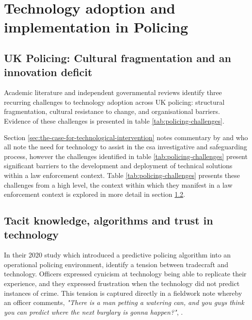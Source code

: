 \documentclass[12pt,a4paper,oneside]{report}
\begin{document}
\chapter{Technology adoption and implementation in Policing}  
\label{ch:technology-adoption-and-implementation-in-policing}

\section{UK Policing: Cultural fragmentation and an innovation deficit}
\label{sec:uk-policing-cultural-fragmentation-and-an-innovation-deficit}
Academic literature and independent governmental reviews identify three recurring challenges to technology adoption across UK policing: structural fragmentation, cultural resistance to change, and organisational barriers. Evidence of these challenges is presented in table \ref{tab:policing-challenges}.

Section \ref{sec:the-case-for-technological-intervention} notes commentary by \citet{winters2016knew,winters2017stages} and \citet{li2020identifying} who all note the need for technology to assist in the \gls{csa} investigative and safeguarding process, however the challenges identified in table \ref{tab:policing-challenges} present significant barriers to the development and deployment of technical solutions within a law enforcement context. Table \ref{tab:policing-challenges} presents these challenges from a high level, the context within which they manifest in a law enforcement context is explored in more detail in section \ref{sec:tacit-knowledge-algorithms-and-trust-in-technology}.

\section{Tacit knowledge, algorithms and trust in technology}
\label{sec:tacit-knowledge-algorithms-and-trust-in-technology}
In their 2020 study which introduced a predictive policing algorithm into an operational policing environment, \citet{ratcliffe2020conflicts} identify a tension between tradecraft and technology.  Officers expressed cynicism at technology being able to replicate their experience, and they expressed frustration when the technology did not predict instances of crime.  This tension is captured directly in a fieldwork note whereby an officer comments, \textit{"There is a man petting a watering can, and you guys think you can predict where the next burglary is gonna happen?"}, \citep{ratcliffe2020conflicts}.
\end{document}
